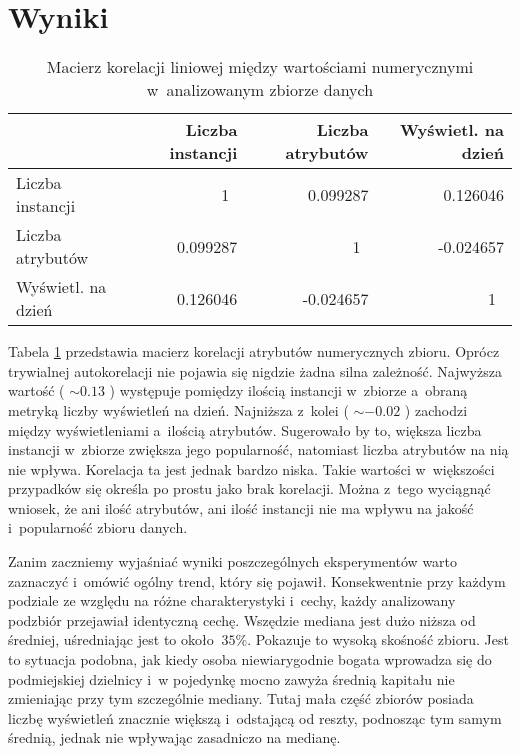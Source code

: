 \section{Wyniki}

\begin{center}
      \begin{table}[ht]
        \begin{tabular}{|l|rrr|}
          \hline
                              & Liczba instancji & Liczba atrybutów & Wyświetl. na dzień \\
          \hline
          Liczba instancji    & 1~               & 0.099287         & 0.126046           \\
          Liczba atrybutów    & 0.099287         & 1~               & -0.024657          \\
          Wyświetl. na dzień  & 0.126046         & -0.024657        & 1~                 \\
          \hline
        \end{tabular}
        \caption{Macierz korelacji liniowej między wartościami numerycznymi w~analizowanym zbiorze danych}
        \label{tab:correlation}
      \end{table}
    \end{center}

Tabela \ref{tab:correlation} przedstawia macierz korelacji atrybutów numerycznych zbioru.
Oprócz trywialnej autokorelacji nie pojawia się nigdzie żadna silna zależność.
Najwyższa wartość ( \( \sim 0.13 \) ) występuje pomiędzy ilością instancji w~zbiorze a~obraną metryką liczby wyświetleń na dzień.
Najniższa z~kolei ( \( \sim -0.02 \) ) zachodzi między wyświetleniami a~ilością atrybutów.
Sugerowało by to, większa liczba instancji w~zbiorze zwiększa jego popularność, natomiast liczba atrybutów na nią nie wpływa.
Korelacja ta jest jednak bardzo niska.
Takie wartości w~większości przypadków się określa po prostu jako brak korelacji.
Można z~tego wyciągnąć wniosek, że ani ilość atrybutów, ani ilość instancji nie ma wpływu na jakość i~popularność zbioru danych.

Zanim zaczniemy wyjaśniać wyniki poszczególnych eksperymentów warto zaznaczyć i~omówić ogólny trend, który się pojawił.
Konsekwentnie przy każdym podziale ze względu na różne charakterystyki i~cechy, każdy analizowany podzbiór przejawiał identyczną cechę.
Wszędzie mediana jest dużo niższa od średniej, uśredniając jest to około \( ~ 35\% \).
Pokazuje to wysoką skośność zbioru.
Jest to sytuacja podobna, jak kiedy osoba niewiarygodnie bogata wprowadza się do podmiejskiej dzielnicy i~w pojedynkę mocno zawyża średnią kapitału nie zmieniając przy tym szczególnie mediany.
Tutaj mała część zbiorów posiada liczbę wyświetleń znacznie większą i~odstającą od reszty, podnosząc tym samym średnią, jednak nie wpływając zasadniczo na medianę.


